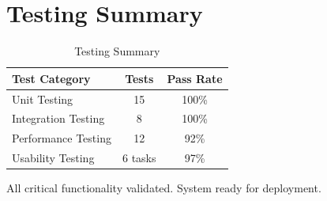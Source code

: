 \section{Testing Summary}
\begin{table}[H]
    \centering
    \begin{tabular}{|l|c|c|}
        \hline
        \textbf{Test Category} & \textbf{Tests} & \textbf{Pass Rate} \\
        \hline
        Unit Testing     & 15 & 100\% \\
        \hline
        Integration Testing & 8  & 100\% \\
        \hline
        Performance Testing & 12 & 92\% \\
        \hline
        Usability Testing   & 6 tasks & 97\% \\
        \hline
    \end{tabular}
    \caption{Testing Summary}
    \label{tab:testing_summary}
\end{table}
All critical functionality validated. System ready for deployment.
